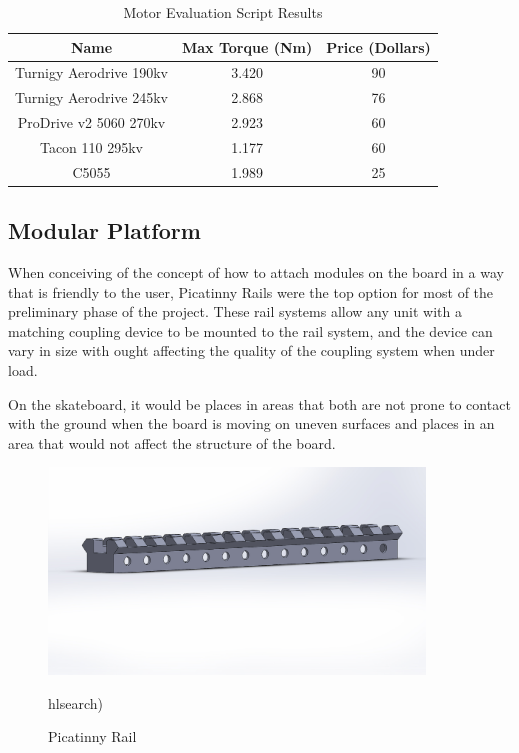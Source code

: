 \documentclass[letterpaper,12pt]{article}
\begin{document}
\begin{table}[]
    \centering
    \begin{tabular}{ |c | c | c| }
        \hline
        \textbf{Name} & \textbf{Max Torque (Nm)} & \textbf{Price (Dollars)} \\
        \hline \hline
        Turnigy Aerodrive 190kv & 3.420 & 90  \\
         \hline
        Turnigy Aerodrive 245kv & 2.868 & 76  \\
         \hline
        ProDrive v2 5060 270kv & 2.923 & 60  \\
        \hline
        Tacon 110 295kv & 1.177 & 60  \\
         \hline
        C5055 & 1.989  & 25  \\
        \hline
    \end{tabular}
    \caption{Motor Evaluation Script Results}
    \label{MotorTable}
\end{table}

\subsection{Modular Platform}
When conceiving of the concept of how to attach modules on the board in a way that is friendly to the user, Picatinny Rails were the top option for most of the preliminary phase of the project. These rail systems allow any unit with a matching coupling device to be mounted to the rail system, and the device can vary in size with ought affecting the quality of the coupling system when under load.

On the skateboard, it would be places in areas that both are not prone to contact with the ground when the board is moving on uneven surfaces and places in an area that would not affect the structure of the board.

\begin{figure}[h]
    \centering
    \includegraphics[width=10cm]{figs/Picatinny_Rail.JPG}
    \caption{Picatinny Rail}
    \label{fig:picTiny0}
    hlsearch)
\end{figure}
\end{document}
